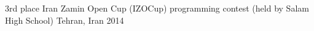 
\begin{cvhonors}

  \cvhonor
    {3rd place} %
    {Iran Zamin Open Cup (IZOCup) programming contest (held by Salam High School)} %
    {Tehran, Iran} %
    {2014} %

\end{cvhonors}

